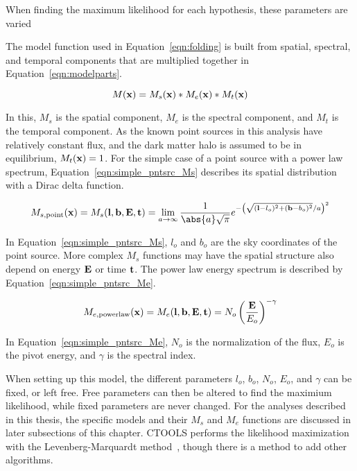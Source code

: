   When finding the maximum likelihood for each hypothesis, these parameters are varied


  
  The model function used in Equation~\ref{eqn:folding} is built from spatial, spectral, and temporal components that are multiplied together in Equation~\ref{eqn:modelparts}.

  \begin{equation}\label{eqn:modelparts}
    M(\mathbf{x }) = M_s(\mathbf{x }) * M_e(\mathbf{x }) * M_t(\mathbf{x })
  \end{equation}
  
  In this, $M_s$ is the spatial component, $M_e$ is the spectral component, and $M_t$ is the temporal component.
  As the known point sources in this analysis have relatively constant flux, and the dark matter halo is assumed to be in equilibrium, $M_t(\mathbf{x })=1$.
  For the simple case of a point source with a power law spectrum, Equation~\ref{eqn:simple_pntsrc_Ms} describes its spatial distribution with a Dirac delta function.
  
  \begin{equation}\label{eqn:simple_pntsrc_Ms}
    M_{s,\textrm{point}}(\xtrue) = M_s(\ltrue,\btrue,\Etrue,\ttrue) = \lim_{a\to\infty} \frac{1}{ \abs{a} \sqrt{\pi} } e^{ - \left ( \sqrt{ (\ltrue-l_o)^2 + (\btrue-b_o)^2 }/a \right )^2 }
  \end{equation}
  
  In Equation~\ref{eqn:simple_pntsrc_Ms}, $l_o$ and $b_o$ are the sky coordinates of the point source.
  More complex $M_s$ functions may have the spatial structure also depend on energy $\mathbf{E }$ or time $\mathbf{t }$.
  The power law energy spectrum is described by Equation~\ref{eqn:simple_pntsrc_Me}.
  
  \begin{equation}\label{eqn:simple_pntsrc_Me}
    M_{e,\textrm{powerlaw}}(\mathbf{x }) = M_e(\mathbf{l },\mathbf{b },\mathbf{E },\mathbf{t }) = N_o \left ( \frac{\mathbf{E }}{E_o} \right )^{-\gamma}
  \end{equation}
  
  In Equation~\ref{eqn:simple_pntsrc_Me}, $N_o$ is the normalization of the flux, $E_o$ is the pivot energy, and $\gamma$ is the spectral index.
  
  When setting up this model, the different parameters $l_o$, $b_o$, $N_o$, $E_o$, and $\gamma$ can be fixed, or left free.
  Free parameters can then be altered to find the maximium likelihood, while fixed parameters are never changed.
  For the analyses described in this thesis, the specific models and their $M_s$ and $M_e$ functions are discussed in later subsections of this chapter.
  CTOOLS performs the likelihood maximization with the Levenberg-Marquardt method~\cite{marquardt1963algorithm}, though there is a method to add other algorithms.
  
